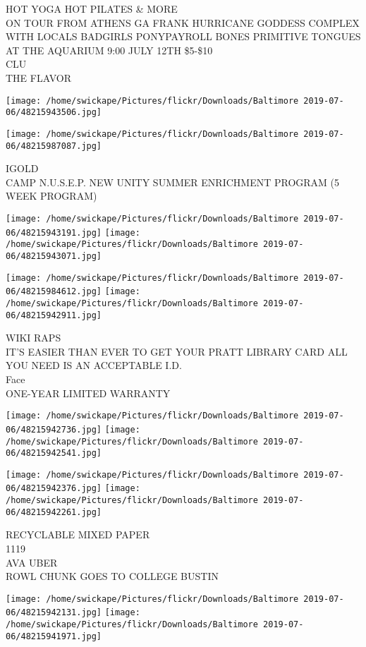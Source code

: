 \documentclass[10pt,letterpaper]{article}
\begin{document}
HOT YOGA HOT PILATES \& MORE\\
ON TOUR FROM ATHENS GA FRANK HURRICANE GODDESS COMPLEX WITH LOCALS BADGIRLS PONYPAYROLL BONES PRIMITIVE TONGUES AT THE AQUARIUM 9:00 JULY 12TH \$5{-}\$10\\
CLU\\
THE FLAVOR
\pagebreak

\texttt{[image: /home/swickape/Pictures/flickr/Downloads/Baltimore 2019-07-06/48215943506.jpg]}

\vspace{0.25in}
\texttt{[image: /home/swickape/Pictures/flickr/Downloads/Baltimore 2019-07-06/48215987087.jpg]}

IGOLD\\
CAMP N.U.S.E.P. NEW UNITY SUMMER ENRICHMENT PROGRAM (5 WEEK PROGRAM)
\pagebreak

\texttt{[image: /home/swickape/Pictures/flickr/Downloads/Baltimore 2019-07-06/48215943191.jpg]}
\texttt{[image: /home/swickape/Pictures/flickr/Downloads/Baltimore 2019-07-06/48215943071.jpg]}

\texttt{[image: /home/swickape/Pictures/flickr/Downloads/Baltimore 2019-07-06/48215984612.jpg]}
\texttt{[image: /home/swickape/Pictures/flickr/Downloads/Baltimore 2019-07-06/48215942911.jpg]}

WIKI RAPS\\
IT'S EASIER THAN EVER TO GET YOUR PRATT LIBRARY CARD ALL YOU NEED IS AN ACCEPTABLE I.D.\\
Face\\
ONE{-}YEAR LIMITED WARRANTY
\pagebreak

\texttt{[image: /home/swickape/Pictures/flickr/Downloads/Baltimore 2019-07-06/48215942736.jpg]}
\texttt{[image: /home/swickape/Pictures/flickr/Downloads/Baltimore 2019-07-06/48215942541.jpg]}

\texttt{[image: /home/swickape/Pictures/flickr/Downloads/Baltimore 2019-07-06/48215942376.jpg]}
\texttt{[image: /home/swickape/Pictures/flickr/Downloads/Baltimore 2019-07-06/48215942261.jpg]}

RECYCLABLE MIXED PAPER\\
1119\\
AVA UBER\\
ROWL CHUNK GOES TO COLLEGE BUSTIN
\pagebreak

\texttt{[image: /home/swickape/Pictures/flickr/Downloads/Baltimore 2019-07-06/48215942131.jpg]}
\texttt{[image: /home/swickape/Pictures/flickr/Downloads/Baltimore 2019-07-06/48215941971.jpg]}
\end{document}
